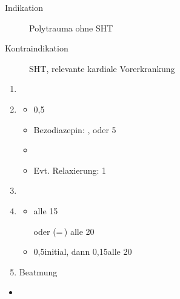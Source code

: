 {%
\begin{description}
  \item[Indikation] Polytrauma ohne SHT
  \item[Kontraindikation] SHT, 
  relevante kardiale Vorerkrankung
\end{description}
\begin{enumerate}
  \item {}
  \item {}
  \begin{itemize}
    \item {} 0,5\Mg*
    \item Bezodiazepin: 
     \Mg*, 
    oder 
     5\Mg*
    \item {} \MgKg*
    \item Evt. Relaxierung: 
     1\MgKg*
  \end{itemize}
  \item {}
  \item {}
  \begin{itemize}
    \item {} \MgKg* alle 15\Min*\par
    oder 
     \Mg* 
    (=\,\Ml*) alle 20\Min*
    \item {} 0,5\MgKg* initial, 
    dann 0,15\MgKg* alle 20\Min*
  \end{itemize}
  \item \StepHeading{}Beatmung
\end{enumerate}
}
{%
\begin{itemize}
  \item 
\end{itemize}
}

